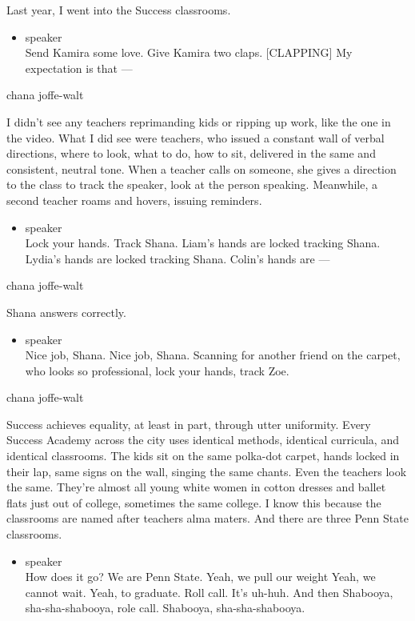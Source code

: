 Last year, I went into the Success classrooms.

\begin{itemize}
\tightlist
\item
  speaker\\
  Send Kamira some love. Give Kamira two claps. {[}CLAPPING{]} My
  expectation is that ---
\end{itemize}

chana joffe-walt

I didn't see any teachers reprimanding kids or ripping up work, like the
one in the video. What I did see were teachers, who issued a constant
wall of verbal directions, where to look, what to do, how to sit,
delivered in the same and consistent, neutral tone. When a teacher calls
on someone, she gives a direction to the class to track the speaker,
look at the person speaking. Meanwhile, a second teacher roams and
hovers, issuing reminders.

\begin{itemize}
\tightlist
\item
  speaker\\
  Lock your hands. Track Shana. Liam's hands are locked tracking Shana.
  Lydia's hands are locked tracking Shana. Colin's hands are ---
\end{itemize}

chana joffe-walt

Shana answers correctly.

\begin{itemize}
\tightlist
\item
  speaker\\
  Nice job, Shana. Nice job, Shana. Scanning for another friend on the
  carpet, who looks so professional, lock your hands, track Zoe.
\end{itemize}

chana joffe-walt

Success achieves equality, at least in part, through utter uniformity.
Every Success Academy across the city uses identical methods, identical
curricula, and identical classrooms. The kids sit on the same polka-dot
carpet, hands locked in their lap, same signs on the wall, singing the
same chants. Even the teachers look the same. They're almost all young
white women in cotton dresses and ballet flats just out of college,
sometimes the same college. I know this because the classrooms are named
after teachers alma maters. And there are three Penn State classrooms.

\begin{itemize}
\tightlist
\item
  speaker\\
  How does it go? We are Penn State. Yeah, we pull our weight Yeah, we
  cannot wait. Yeah, to graduate. Roll call. It's uh-huh. And then
  Shabooya, sha-sha-shabooya, role call. Shabooya, sha-sha-shabooya.
\end{itemize}

